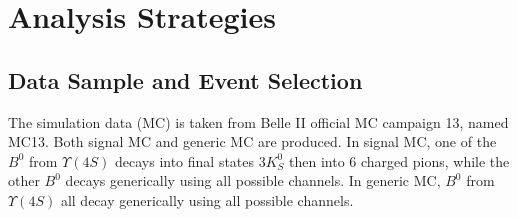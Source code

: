 \chapter{Analysis Strategies}

\section{Data Sample and Event Selection}
The simulation data (MC) is taken from Belle II official MC campaign 13, named MC13. Both signal MC and generic MC are produced. In signal MC, one of the $B^0$ from $\Upsilon(4S)$ decays into final states 3$K_S^0$ then into 6 charged pions, while the other $B^0$ decays generically using all possible channels. In generic MC,  $B^0$ from  $\Upsilon(4S)$ all decay generically using all possible channels.

